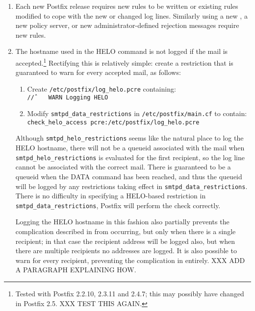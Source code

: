 \begin{enumerate}

    \item Each new Postfix release requires new rules to be written or
        existing rules modified to cope with the new or changed log lines.
        Similarly using a new \DNSBL{}, a new policy server, or new
        administrator-defined rejection messages require new rules.

    \item The hostname used in the HELO command is not logged if the mail
        is accepted.\footnote{Tested with Postfix 2.2.10, 2.3.11 and 2.4.7;
        this may possibly have changed in Postfix 2.5. XXX TEST THIS
        AGAIN.}  Rectifying this is relatively simple: create a restriction
        that is guaranteed to warn for every accepted mail, as follows:

        \begin{enumerate}

            \item Create \texttt{/etc/postfix/log\_helo.pcre}
                containing:\newline{} \tab{}\texttt{/\^/~~~~WARN~Logging~HELO}

            \item Modify \texttt{smtpd\_data\_restrictions} in
                \texttt{/etc/postfix/main.cf} to contain:\newline{}
                \tab{}\texttt{check\_helo\_access~pcre:/etc/postfix/log\_helo.pcre}

        \end{enumerate}

        Although \texttt{smtpd\_helo\_restrictions} seems like the natural
        place to log the HELO hostname, there will not be a queueid
        associated with the mail when \texttt{smtpd\_helo\_restrictions} is
        evaluated for the first recipient, so the log line cannot be
        associated with the correct mail.  There is guaranteed to be a
        queueid when the DATA command has been reached, and thus the
        queueid will be logged by any restrictions taking effect in
        \texttt{smtpd\_data\_restrictions}.  There is no difficulty in
        specifying a HELO-based restriction in
        \texttt{smtpd\_data\_restrictions}, Postfix will perform the check
        correctly.

        Logging the HELO hostname in this fashion also partially prevents
        the complication described in  from occurring, but only when there is a
        single recipient; in that case the recipient address will be logged
        also, but when there are multiple recipients no addresses are
        logged.  It is also possible to warn for every recipient,
        preventing the complication in  entirely.  XXX ADD A PARAGRAPH EXPLAINING
        HOW\@.


\end{enumerate}
